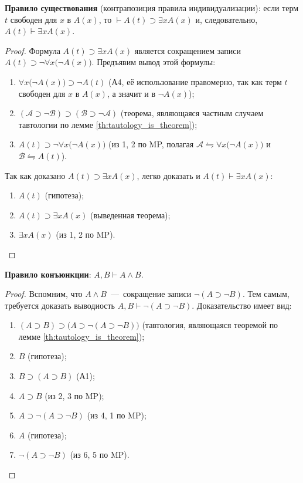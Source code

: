\textbf{Правило существования} (контрапозиция правила индивидуализации): если терм $t$ свободен для $x$ в $A(x)$, то $\vdash A(t) \supset \exists xA(x)$ и, следовательно, $A(t) \vdash \exists xA(x)$.
\begin{proof}
    Формула $A(t) \supset \exists xA(x)$ является сокращением записи $A(t) \supset \neg \forall x\big(\neg A(x)\big)$. Предъявим вывод этой формулы:
    \begin{enumerate}
        \item $\forall x\big(\neg A(x)\big) \supset \neg A(t)$ (А4, её использование правомерно, так как терм $t$ свободен для $x$ в $A(x)$, а значит и в $\neg A(x)$);
        \item $(\mathcal{A} \supset \neg \mathcal{B}) \supset (\mathcal{B} \supset \neg \mathcal{A})$ (теорема, являющаяся частным случаем тавтологии по лемме \ref{th:tautology_is_theorem});
        \item $A(t) \supset \neg\forall x\big(\neg A(x)\big)$ (из 1, 2 по MP, полагая $\mathcal{A} \leftrightharpoons \forall x\big(\neg A(x)\big)$ и $\mathcal{B} \leftrightharpoons A(t)$).
    \end{enumerate}
    Так как доказано $A(t) \supset \exists xA(x)$, легко доказать и $A(t) \vdash \exists xA(x)$:
    \begin{enumerate}
        \item $A(t)$ (гипотеза);
        \item $A(t) \supset \exists xA(x)$ (выведенная теорема);
        \item $\exists xA(x)$ (из 1, 2 по MP).
    \end{enumerate}
\end{proof}

\textbf{Правило конъюнкции}: $A, B \vdash A \land B$.
\begin{proof}Вспомним, что $A \land B$~---~сокращение записи $\neg(A \supset \neg B)$. Тем самым, требуется доказать выводиость $A, B \vdash \neg(A \supset \neg B)$. Доказательство имеет вид:
    \begin{enumerate}
        \item $(A \supset B) \supset \big(A \supset \neg(A \supset \neg B)\big)$ (тавтология, являющаяся теоремой по лемме \ref{th:tautology_is_theorem});
        \item $B$ (гипотеза);
        \item $B \supset (A \supset B)$ (А1);
        \item $A \supset B$ (из 2, 3 по MP);
        \item $A \supset \neg(A \supset \neg B)$ (из 4, 1 по MP);
        \item $A$ (гипотеза);
        \item $\neg(A \supset \neg B)$ (из 6, 5 по MP).
    \end{enumerate}
\end{proof}

